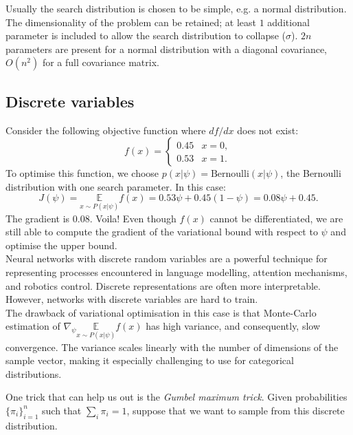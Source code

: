  Usually the search distribution is chosen to be simple, e.g. a normal distribution.\\

The dimensionality of the problem can be retained; at least $1$ additional parameter is included to allow the search distribution to collapse ($\sigma$). $2n$ parameters are present for a normal distribution with a diagonal covariance, $O(n^2)$ for a full covariance matrix. 


\minirule

\subsection{Discrete variables}

Consider the following objective function where $df/dx$ does not exist:
\begin{equation*}
f(x) = \begin{cases} 0.45 & x =0,\\ 0.53 & x =1.\end{cases}
\end{equation*}
To optimise this function, we choose $p(x|\psi) = \textrm{Bernoulli}(x|\psi)$, the Bernoulli distribution with one search parameter. In this case:
\begin{equation*}
J(\psi) = \underset{x \sim P(x|\psi)}{\mathbb{E}} f(x) = 0.53\psi + 0.45(1-\psi) = 0.08\psi + 0.45.
\end{equation*}
The gradient is $0.08$. Voila! Even though $f(x)$ cannot be differentiated, we are still able to compute the gradient of the variational bound with respect to $\psi$ and optimise the upper bound.\\

Neural networks with discrete random variables are a powerful technique for representing processes encountered in language modelling, attention mechanisms, and robotics control. Discrete representations are often more interpretable. However, networks with discrete variables are hard to train.\\

The drawback of variational optimisation in this case is that Monte-Carlo estimation of $\nabla_{\psi} \underset{x \sim P(x | \psi)}{\mathbb{E}} f(x)$ has high variance, and consequently, slow convergence. The variance scales linearly with the number of dimensions of the sample vector, making it especially challenging to use for categorical distributions.

\newpage
One trick that can help us out is the \textit{Gumbel maximum trick}. Given probabilities $\{\pi_i\}_{i=1}^{n}$ such that $\sum_{i} \pi_i = 1$, suppose that we want to sample from this discrete distribution.

